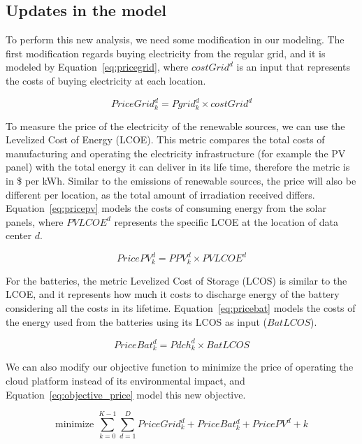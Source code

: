 \subsection{Updates in the model}

To perform this new analysis, we need some modification in our modeling. The first modification regards buying electricity from the regular grid, and it is modeled by Equation~\eqref{eq:pricegrid}, where $costGrid^d$ is an input that represents the costs of buying electricity at each location. 

\begin{equation} \label{eq:pricegrid}
 PriceGrid^d_k = Pgrid^d_k \times costGrid^d
\end{equation}

To measure the price of the electricity of the renewable sources, we can use the Levelized Cost of Energy (LCOE). This metric compares the total costs of manufacturing and operating the electricity infrastructure (for example the PV panel) with the total energy it can deliver in its life time, therefore the metric is in \$ per kWh. Similar to the  emissions of renewable sources, the price will also be different per location, as the total amount of irradiation received differs.  Equation~\eqref{eq:pricepv} models the costs of consuming energy from the solar panels, where $PVLCOE^d$ represents the specific LCOE at the location of data center $d$. 

\begin{equation} \label{eq:pricepv}
  PricePV^d_k = PPV^d_k \times PVLCOE^d
\end{equation}

For the batteries, the metric Levelized Cost of Storage (LCOS) is similar to the LCOE, and it represents how much it costs to discharge energy of the battery considering all the costs in its lifetime. Equation~\eqref{eq:pricebat} models the costs of the energy used from the batteries using its LCOS as input ($BatLCOS$).

\begin{equation} \label{eq:pricebat}
   PriceBat^d_k = Pdch^d_k \times BatLCOS
\end{equation}


We can also modify our objective function to minimize the price of operating the cloud platform instead of its environmental impact, and Equation~\eqref{eq:objective_price} model this new objective.

\begin{equation} \label{eq:objective_price}
\text{minimize }\sum_{k=0}^{K-1} \sum_{d=1}^D PriceGrid^d_k  + PriceBat^d_k + PricePV^d+k
\end{equation}

